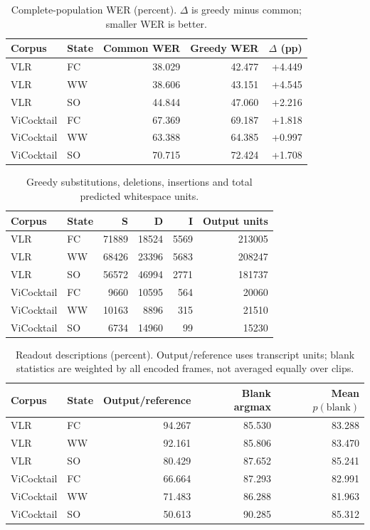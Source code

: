 \begin{table}[htbp]
\centering\small
\caption{Complete-population WER (percent). $\Delta$ is greedy minus common; smaller WER is better.}
\begin{tabular}{llrrr}
\toprule
Corpus & State & Common WER & Greedy WER & $\Delta$ (pp)\\
\midrule
VLR & FC & 38.029 & 42.477 & +4.449\\
VLR & WW & 38.606 & 43.151 & +4.545\\
VLR & SO & 44.844 & 47.060 & +2.216\\
ViCocktail & FC & 67.369 & 69.187 & +1.818\\
ViCocktail & WW & 63.388 & 64.385 & +0.997\\
ViCocktail & SO & 70.715 & 72.424 & +1.708\\
\bottomrule
\end{tabular}
\end{table}
\begin{table}[htbp]
\centering\small
\caption{Greedy substitutions, deletions, insertions and total predicted whitespace units.}
\begin{tabular}{llrrrr}
\toprule
Corpus & State & S & D & I & Output units\\
\midrule
VLR & FC & 71889 & 18524 & 5569 & 213005\\
VLR & WW & 68426 & 23396 & 5683 & 208247\\
VLR & SO & 56572 & 46994 & 2771 & 181737\\
ViCocktail & FC & 9660 & 10595 & 564 & 20060\\
ViCocktail & WW & 10163 & 8896 & 315 & 21510\\
ViCocktail & SO & 6734 & 14960 & 99 & 15230\\
\bottomrule
\end{tabular}
\end{table}
\begin{table}[htbp]
\centering\small
\caption{Readout descriptions (percent). Output/reference uses transcript units; blank statistics are weighted by all encoded frames, not averaged equally over clips.}
\begin{tabular}{llrrr}
\toprule
Corpus & State & Output/reference & Blank argmax & Mean $p(\mathrm{blank})$\\
\midrule
VLR & FC & 94.267 & 85.530 & 83.288\\
VLR & WW & 92.161 & 85.806 & 83.470\\
VLR & SO & 80.429 & 87.652 & 85.241\\
ViCocktail & FC & 66.664 & 87.293 & 82.991\\
ViCocktail & WW & 71.483 & 86.288 & 81.963\\
ViCocktail & SO & 50.613 & 90.285 & 85.312\\
\bottomrule
\end{tabular}
\end{table}
